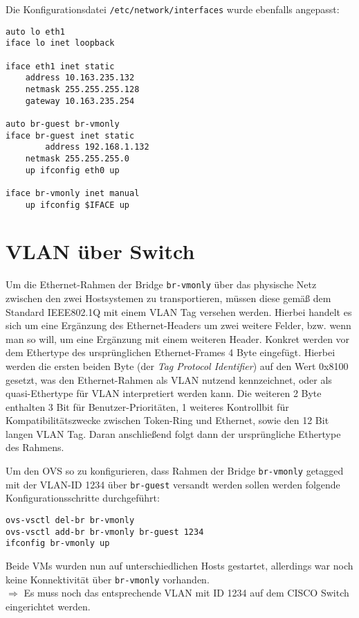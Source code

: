 Die Konfigurationsdatei \verb#/etc/network/interfaces# wurde ebenfalls angepasst:
\setupVerbatimOut
\begin{verbatim}
auto lo eth1
iface lo inet loopback

iface eth1 inet static
    address 10.163.235.132
	netmask 255.255.255.128
	gateway 10.163.235.254

auto br-guest br-vmonly
iface br-guest inet static
        address 192.168.1.132
	netmask 255.255.255.0
	up ifconfig eth0 up

iface br-vmonly inet manual 
	up ifconfig $IFACE up 
\end{verbatim}

\section{VLAN über Switch}
Um die Ethernet-Rahmen der Bridge \verb#br-vmonly# über das physische Netz zwischen den zwei Hostsystemen zu transportieren, müssen diese gemäß dem Standard IEEE802.1Q \cite{ieee8021q} mit einem VLAN Tag versehen werden. Hierbei handelt es sich um eine Ergänzung des Ethernet-Headers um zwei weitere Felder, bzw. wenn man so will, um eine Ergänzung mit einem weiteren Header. Konkret werden vor dem Ethertype des ursprünglichen Ethernet-Frames 4 Byte eingefügt. Hierbei werden die ersten beiden Byte (der \emph{Tag Protocol Identifier}) auf den Wert 0x8100 gesetzt, was den Ethernet-Rahmen als VLAN nutzend kennzeichnet, oder als quasi-Ethertype für VLAN interpretiert werden kann. Die weiteren 2 Byte enthalten 3 Bit für Benutzer-Prioritäten, 1 weiteres Kontrollbit für Kompatibilitätszwecke zwischen Token-Ring und Ethernet, sowie den 12 Bit langen VLAN Tag. Daran anschließend folgt dann der ursprüngliche Ethertype des Rahmens.

Um den OVS so zu konfigurieren, dass Rahmen der Bridge \verb#br-vmonly# getagged mit der VLAN-ID 1234 über \verb#br-guest# versandt werden sollen werden folgende Konfigurationsschritte durchgeführt:\setupVerbatimOut
\begin{verbatim}
ovs-vsctl del-br br-vmonly
ovs-vsctl add-br br-vmonly br-guest 1234
ifconfig br-vmonly up
\end{verbatim}
Beide VMs wurden nun auf unterschiedlichen Hosts gestartet, allerdings war noch keine Kon\-nek\-tiv\-ität über \verb#br-vmonly# vorhanden.
\\
$\Rightarrow$ Es muss noch das entsprechende VLAN mit ID 1234 auf dem CISCO Switch eingerichtet werden.\\

